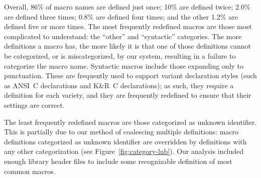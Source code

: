\documentclass[10pt]{article}
\newcommand{\captionsmall}[1]{\caption[]{\small #1}}
\begin{document}


Overall, 86\% of macro names are defined just once; 10\% are defined twice;
2.0\% are defined three times; 0.8\% are defined four times; and the other
1.2\% are defined five or more times.
The most frequently redefined macros are those most complicated to
understand: the ``other'' and ``syntactic'' categories.  The more
definitions a macro has, the more likely it is that one of those
definitions cannot be categorized, or is miscategorized, by our system,
resulting in a failure to categorize the macro name.  Syntactic macros
include those expanding only to punctuation.  These are frequently used to
support variant declaration styles (such as ANSI~C declarations and K\&R~C
declarations); as such, they require a definition for each variety, and
they are frequently redefined to ensure that their
settings are correct.


The least frequently redefined macros are those categorized as unknown
identifier.  This is partially due to our method of coalescing multiple
definitions:  macro definitions categorized as unknown identifier are overridden
by definitions with any other categorization (see
Figure~\ref{fig:category-lub}).  Our
analysis included enough library header files to include some
recognizable definition of most common macros.
\end{document}
